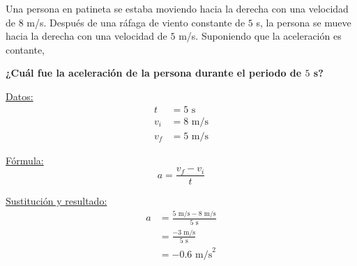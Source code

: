 Una persona en patineta se estaba moviendo hacia la derecha con una velocidad de $8$ m/s.
Después de una ráfaga de viento constante de $5$ s, la persona se mueve hacia la derecha con una velocidad de $5$ m/s.
Suponiendo que la aceleración es contante,

\textbf{¿Cuál fue la aceleración de la persona durante el periodo de $5$ s?}

\begin{minipage}[c]{\linewidth}
    \begin{solutionbox}{5cm}
        \begin{minipage}[t]{0.3\textwidth}
            \centering
            \underline{Datos:}
            \begin{align*}
                t   & =  5 \text{ s}   \\
                v_i & = 8  \text{ m/s} \\
                v_f & = 5  \text{ m/s}
            \end{align*}
        \end{minipage}%
        \begin{minipage}[t]{0.3\textwidth}
            \centering
            \underline{F\'ormula:}
            \begin{equation*}
                a=\frac{v_f-v_i}{t}
            \end{equation*}
        \end{minipage}
        \begin{minipage}[t]{0.3\textwidth}
            \centering
            \underline{Sustituci\'on y resultado:}
            \begin{align*}
                a & =\frac{5 \text{ m/s}-8 \text{ m/s}}{5 \text{ s}} \\
                  & = \frac{-3 \text{ m/s}}{5 \text{ s}}             \\
                  & =-0.6 \text{ m/s}^2
            \end{align*}
        \end{minipage}
    \end{solutionbox}
\end{minipage}